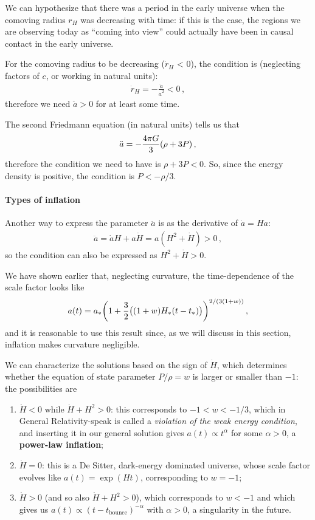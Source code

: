 \documentclass[main.tex]{subfiles}
\begin{document}
We can hypothesize that there was a period in the early universe when the comoving radius \(r_H\) was decreasing with time: if this is the case, the regions we are observing today as ``coming into view'' could actually have been in causal contact in the early universe.

For the comoving radius to be decreasing (\(\dot{r}_H\) < 0), the condition is (neglecting factors of \(c\), or working in natural units):
%
\begin{align}
  \dot{r}_H = - \frac{ \ddot{a} }{\dot{a}^2} <0
\,,
\end{align}
%
therefore we need \(\ddot{a} >0\) for at least some time.

The second Friedmann equation (in natural units) tells us that
%
\begin{align}
  \ddot{a} = -\frac{4 \pi G }{3} \qty(\rho + 3P)
\,,
\end{align}
%
therefore the condition we need to have is \(\rho + 3P <0\).
So, since the energy density is positive, the condition is \(P < - \rho /3\).

\paragraph{Types of inflation}

Another way to express the parameter \(\ddot{a}\) is as the derivative of \(\dot{a} = Ha\):
%
\begin{align}
  \ddot{a} = \dot{a}H + a \dot{H} = a (H^2 + \dot{H})>0
\,,
\end{align}
%
so the condition can also be expressed as \(H^2+ \dot{H} >0\).

We have shown earlier that, neglecting curvature, the time-dependence of the scale factor looks like
%
\begin{align}
  a(t) = a_{*} \qty(1 + \frac{3}{2}\qty((1+w)H_{*}\qty(t-t_{*})))^{2/ (3(1+w))}
\,,
\end{align}
%
and it is reasonable to use this result since, as we will discuss in this section, inflation makes curvature negligible. 

We can characterize the solutions based on the sign of \(\dot{H}\), which determines whether the equation of state parameter \(P / \rho = w\) is larger or smaller than \(-1\): the possibilities are
\begin{enumerate}
    \item \(\dot{H} < 0\) while \(\dot{H} + H^2 >0\): this corresponds to \(-1 < w < -1/3\), which in General Relativity-speak is called a \emph{violation of the weak energy condition}, and inserting it in our general solution gives \(a(t) \propto t^{\alpha }\) for some \(\alpha > 0\), a \textbf{power-law inflation};
    \item \(\dot{H} =0\): this is a De Sitter, dark-energy dominated universe, whose scale factor evolves like \(a(t) = \exp(Ht) \), corresponding to \(w = -1\);
    \item \(\dot{H} >0\) (and so also \(\dot{H} + H^2 > 0\)),
    which corresponds to \(w<-1\) and which gives us \(a(t) \propto (t - t _{\text{bounce}})^{-\alpha }\) with \(\alpha > 0\), a singularity in the future. 
\end{enumerate}
\end{document}
